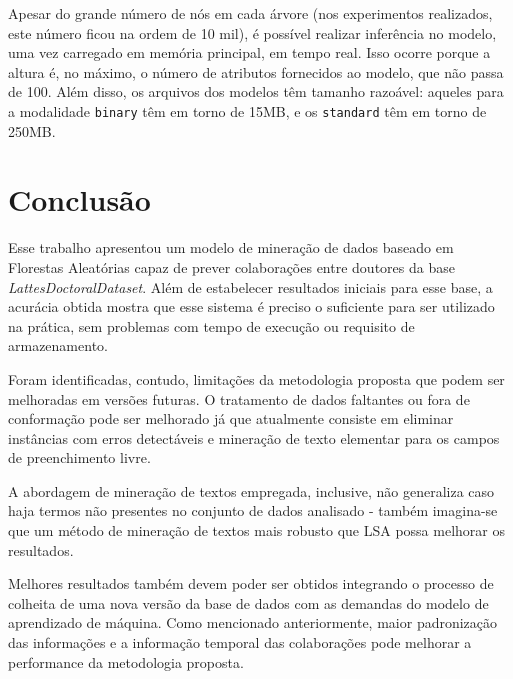 \documentclass[12pt]{article}
\begin{document}
Apesar do grande número de nós em cada árvore (nos experimentos realizados, este número ficou na ordem de 10 mil), é possível realizar inferência no modelo, uma vez carregado em memória principal, em tempo real.
Isso ocorre porque a altura é, no máximo, o número de atributos fornecidos ao modelo, que não passa de 100. %
Além disso, os arquivos dos modelos têm tamanho razoável: aqueles para a modalidade \texttt{binary} têm em torno de 15MB, e os \texttt{standard} têm em torno de 250MB.


\section{Conclusão}
\label{sec:conclusion}

Esse trabalho apresentou um modelo de mineração de dados baseado em Florestas Aleatórias capaz de prever colaborações entre doutores da base \emph{LattesDoctoralDataset}.
Além de estabelecer resultados iniciais para esse base, a acurácia obtida mostra que esse sistema é preciso o suficiente para ser utilizado na prática, sem problemas com tempo de execução ou requisito de armazenamento.

Foram identificadas, contudo, limitações da metodologia proposta que podem ser melhoradas em versões futuras.
O tratamento de dados faltantes ou fora de conformação pode ser melhorado já que atualmente consiste em eliminar instâncias com erros detectáveis e mineração de texto elementar para os campos de preenchimento livre.

A abordagem de mineração de textos empregada, inclusive, não generaliza caso haja termos não presentes no conjunto de dados analisado - também imagina-se que um método de mineração de textos mais robusto que LSA possa melhorar os resultados.

Melhores resultados também devem poder ser obtidos integrando o processo de colheita de uma nova versão da base de dados com as demandas do modelo de aprendizado de máquina.
Como mencionado anteriormente, maior padronização das informações e a informação temporal das colaborações pode melhorar a performance da metodologia proposta.



\end{document}
